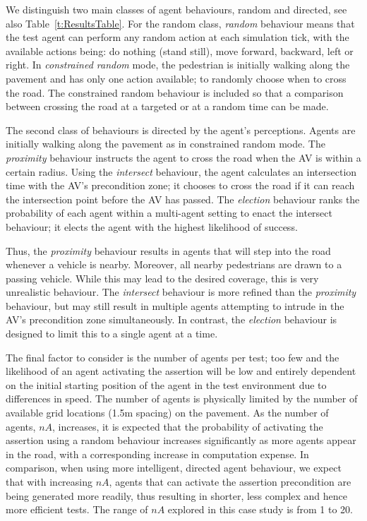 \documentclass[letterpaper, 10 pt, journal, twoside]{IEEEtran}
\begin{document}
We distinguish two main classes of agent behaviours, random and directed, see also Table~\ref{t:ResultsTable}. For the random class, \textit{random} behaviour means that the test agent can perform any random action at each simulation tick, with the available actions being: do nothing (stand still), move forward, backward, left or right. In \textit{constrained random} mode, the pedestrian is initially walking along the pavement and has only one action available; to randomly choose when to cross the road. The constrained random behaviour is included so that a comparison between crossing the road at a targeted or at a random time can be made. 

The second class of behaviours is directed by the agent's perceptions. Agents are initially walking along the pavement as in constrained random mode. The \textit{proximity} behaviour instructs the agent to cross the road when the AV is within a certain radius. Using the \textit{intersect} behaviour, the agent calculates an intersection time with the AV's precondition zone; it chooses to cross the road if it can reach the intersection point before the AV has passed. The \textit{election} behaviour ranks the probability of each agent within a multi-agent setting to enact the intersect behaviour; it elects the agent with the highest likelihood of success.

Thus, the \textit{proximity} behaviour results in agents that will step into the road whenever a vehicle is nearby. Moreover, all nearby pedestrians are drawn to a passing vehicle.
%
While this may lead to the desired coverage, this is very unrealistic behaviour. 
%
The \textit{intersect} behaviour is more refined than the \textit{proximity} behaviour, but may still result in multiple agents attempting to intrude in the AV's precondition zone simultaneously. 
%
In contrast, the \textit{election} behaviour is designed to limit this to a single agent at a time.

The final factor to consider is the number of agents per test; too few and the likelihood of an agent activating the assertion will be low and entirely dependent on the initial starting position of the agent in the test environment due to differences in speed. The number of agents is physically limited by the number of available grid locations (1.5m spacing) on the pavement. %
%
As the number of agents, $nA$, increases, it is expected that the probability of activating the assertion using a random behaviour increases significantly as more agents appear in the road, with a corresponding increase in computation expense. 
%
In comparison, when using more intelligent, directed agent behaviour, we expect that with increasing $nA$, agents that can activate the assertion precondition are being generated more readily, thus resulting in shorter, less complex and hence more efficient tests. The range of $nA$ explored in this case study is from 1 to 20.
\end{document}
